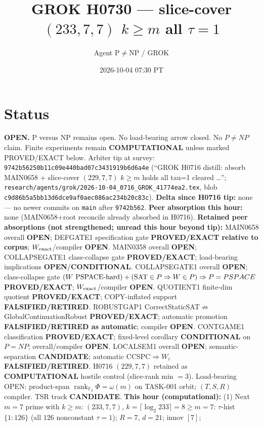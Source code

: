 \documentclass[11pt]{article}
\title{GROK H0730 --- slice-cover $(233,7,7)$ $k{\ge}m$ all $\tau{=}1$}
\author{Agent P$\neq$NP / GROK}
\date{2026-10-04 07:30 PT}
\begin{document}
\maketitle

\section*{Status}
\textbf{OPEN.} P versus NP remains open. No load-bearing arrow closed. No $P\neq NP$ claim.
Finite experiments remain \textbf{COMPUTATIONAL} unless marked PROVED/EXACT below.
Arbiter tip at survey: \texttt{9742b56250b11c09e440bad07c3431919b6d6a4e}
(``GROK H0716 distill: absorb MAIN0658 + slice-cover $(229,7,7)$ $k{\ge}m$ holds all tau=1 cleared \ldots'';
\texttt{research/agents/grok/2026-10-04\_0716\_GROK\_41774ea2.tex},
blob \texttt{c9d86b5a5bb13d6dce9af0aec086ac234b20c83c}).
\textbf{Delta since H0716 tip:} none --- no newer commits on \texttt{main} after \texttt{9742b562}.
\textbf{Peer absorption this hour:} none (MAIN0658+root reconcile already absorbed in H0716).
\textbf{Retained peer absorptions (not strengthened; unread this hour beyond tip):}
MAIN0658 overall \textbf{OPEN}; DEFGATE1 specification gate \textbf{PROVED/EXACT relative to corpus};
$W_{\rm exact}$/compiler \textbf{OPEN}.
MAIN0358 overall \textbf{OPEN}; COLLAPSEGATE1 class-collapse gate \textbf{PROVED/EXACT};
load-bearing implications \textbf{OPEN}/\textbf{CONDITIONAL}.
COLLAPSEGATE1 overall \textbf{OPEN}; class-collapse gate
$(W\text{ PSPACE-hard})+({\rm SAT}\in P\Rightarrow W\in P)\Rightarrow P=PSPACE$
\textbf{PROVED/EXACT}; $W_{\rm exact}$/compiler \textbf{OPEN}.
QUOTIENT1 finite-dim quotient \textbf{PROVED/EXACT}; COPY-inflated support \textbf{FALSIFIED/RETIRED}.
ROBUSTGAP1 CorrectStaticSAT$\not\Rightarrow$GlobalContinuationRobust \textbf{PROVED/EXACT};
automatic promotion \textbf{FALSIFIED/RETIRED as automatic}; compiler \textbf{OPEN}.
CONTGAME1 classification \textbf{PROVED/EXACT}; fixed-level corollary \textbf{CONDITIONAL} on $P=NP$;
overall/compiler \textbf{OPEN}.
LOCALSEM1 overall \textbf{OPEN}; semantic-separation \textbf{CANDIDATE}; automatic CCSPC$\Rightarrow W_i$
\textbf{FALSIFIED/RETIRED}.
H0716 $(229,7,7)$ retained as \textbf{COMPUTATIONAL} hostile control (slice-rank min $=3$).
Load-bearing OPEN: product-span $\operatorname{rank}_{\mathbb F_2}\Phi=\omega(m)$ on TASK-001 orbit;
$(T,S,R)$ compiler. TSR track \textbf{CANDIDATE}.
\textbf{This hour (computational):}
(1) Next $m{=}7$ prime with $k{\ge}m$: $(233,7,7)$, $k=\lceil\log_2 233\rceil=8{\ge}m{=}7$:
$\tau$-hist $\{1{:}126\}$ (all $126$ nonconstant $\tau{=}1$); $R{=}7$, $d{=}21$; innov $[7]$;
\end{document}
